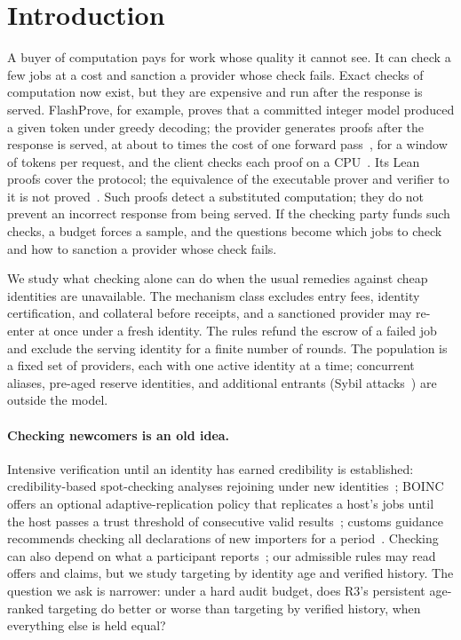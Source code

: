 \documentclass[11pt]{article}
\begin{document}
\section{Introduction}\label{sec:intro}
A buyer of computation pays for work whose quality it cannot see. It can check a few jobs at a cost and sanction a provider whose check fails. Exact checks of computation now exist, but they are expensive and run after the response is served.
FlashProve, for example, proves that a committed integer model produced a given token under greedy decoding; the provider generates proofs after the response is served, at about  to  times the cost of one forward pass~\cite[p.~18]{rinberg2026flashprove}, for a window of  tokens per request, and the client checks each proof on a CPU~\cite[pp.~16--17]{rinberg2026flashprove}. Its Lean proofs cover the protocol; the equivalence of the executable prover and verifier to it is not proved~\cite[p.~17]{rinberg2026flashprove}. Such proofs detect a substituted computation; they do not prevent an incorrect response from being served. If the checking party funds such checks, a budget forces a sample, and the questions become which jobs to check and how to sanction a provider whose check fails.

We study what checking alone can do when the usual remedies against cheap identities are unavailable. The mechanism class excludes entry fees, identity certification, and collateral before receipts, and a sanctioned provider may re-enter at once under a fresh identity. The rules refund the escrow of a failed job and exclude the serving identity for a finite number of rounds. The population is a fixed set of providers, each with one active identity at a time; concurrent aliases, pre-aged reserve identities, and additional entrants (Sybil attacks~\cite{douceur2002sybil}) are outside the model.

\paragraph{Checking newcomers is an old idea.} Intensive verification until an identity has earned credibility is established: credibility-based spot-checking analyses rejoining under new identities~\cite{sarmenta2001ccgrid,sarmenta2001sabotage}; BOINC offers an optional adaptive-replication policy that replicates a host's jobs until the host passes a trust threshold of consecutive valid results~\cite{anderson2009diversity,boincwiki}; customs guidance recommends checking all declarations of new importers for a period~\cite{walsh2003postrelease}. Checking can also depend on what a participant reports~\cite{zarkoob2020spot}; our admissible rules may read offers and claims, but we study targeting by identity age and verified history. The question we ask is narrower: under a hard audit budget, does R3's persistent age-ranked targeting do better or worse than targeting by verified history, when everything else is held equal?
\end{document}
